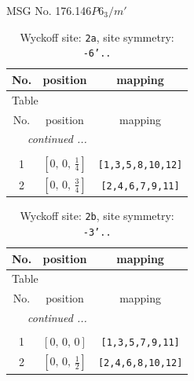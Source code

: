 \documentclass[fleqn,8pt]{jsarticle}
\begin{document}
\setcounter{MaxMatrixCols}{32}

\renewcommand{\tablename}{Table~}
\renewcommand{\figurename}{Figure~}
\begin{center}
\LARGE
MSG No. 176.146\quad$P6_{3}/m'$
\end{center}
\renewcommand{\arraystretch}{1.2}
\begin{longtable}{ccc}
\caption{Wyckoff site: {\tt 2a}, site symmetry: {\tt -6'..}}
 \\
 \hline \hline
No. & position & mapping \\ \hline \endfirsthead

\multicolumn{2}{l}{\tablename\ \thetable{}} \\
 \hline \hline
No. & position & mapping \\ \hline \endhead

 \hline \hline
\multicolumn{2}{r}{\footnotesize\it continued ...} \\ \endfoot

 \hline \hline
\multicolumn{2}{r}{} \\ \endlastfoot

1 & $\left[ 0,\, 0,\, \frac{1}{4} \right]$ & {\tt [1,3,5,8,10,12]} \\ \hline
2 & $\left[ 0,\, 0,\, \frac{3}{4} \right]$ & {\tt [2,4,6,7,9,11]} \\
\end{longtable}
\renewcommand{\arraystretch}{1.2}
\begin{longtable}{ccc}
\caption{Wyckoff site: {\tt 2b}, site symmetry: {\tt -3'..}}
 \\
 \hline \hline
No. & position & mapping \\ \hline \endfirsthead

\multicolumn{2}{l}{\tablename\ \thetable{}} \\
 \hline \hline
No. & position & mapping \\ \hline \endhead

 \hline \hline
\multicolumn{2}{r}{\footnotesize\it continued ...} \\ \endfoot

 \hline \hline
\multicolumn{2}{r}{} \\ \endlastfoot

1 & $\left[ 0,\, 0,\, 0 \right]$ & {\tt [1,3,5,7,9,11]} \\ \hline
2 & $\left[ 0,\, 0,\, \frac{1}{2} \right]$ & {\tt [2,4,6,8,10,12]} \\
\end{longtable}
\end{document}
